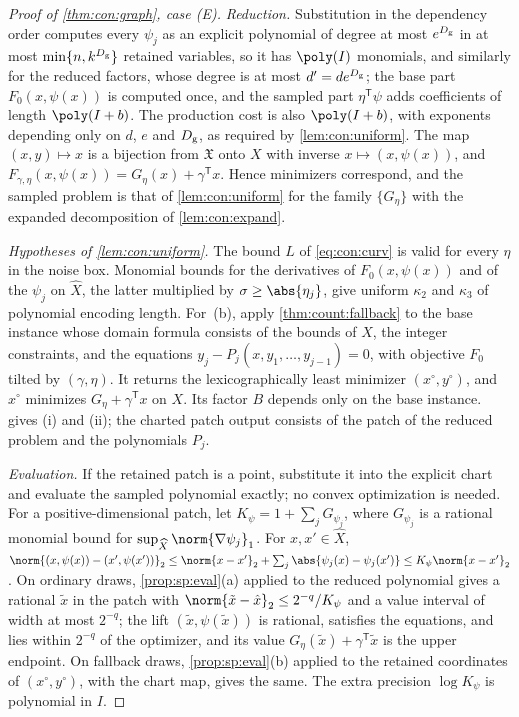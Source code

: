 \begin{proof}[Proof of \cref{thm:con:graph}, case (E)]
\emph{Reduction.} Substitution in the dependency order computes every
$\psi_j$ as an explicit polynomial of degree at most $e^{D_{\rm g}}$ in at
most $\min\{n,k^{D_{\rm g}}\}$ retained variables, so it has
$\poly(I)$ monomials, and similarly for the reduced factors, whose degree is
at most $d'=de^{D_{\rm g}}$; the base part $F_0(x,\psi(x))$ is computed once,
and the sampled part $\eta^{\mathsf T}\psi$ adds coefficients of length
$\poly(I+b)$. The production cost is also $\poly(I+b)$, with exponents
depending only on $d$, $e$ and $D_{\rm g}$, as required by
\cref{lem:con:uniform}. The map $(x,y)\mapsto x$ is a bijection from $\mathfrak X$ onto
$X$ with inverse $x\mapsto(x,\psi(x))$, and
$F_{\gamma,\eta}(x,\psi(x))=G_\eta(x)+\gamma^{\mathsf T}x$. Hence minimizers
correspond, and the sampled problem is that of \cref{lem:con:uniform} for the
family $\{G_\eta\}$ with the expanded decomposition of \cref{lem:con:expand}.

\emph{Hypotheses of \cref{lem:con:uniform}.} The bound $L$ of
\eqref{eq:con:curv} is valid for every $\eta$ in the noise box. Monomial
bounds for the derivatives of $F_0(x,\psi(x))$ and of the $\psi_j$ on
$\widehat X$, the latter multiplied by $\sigma\ge\abs{\eta_j}$, give uniform
$\kappa_2$ and $\kappa_3$ of polynomial encoding length. For~(b), apply
\cref{thm:count:fallback} to the base instance whose domain formula consists
of the bounds of $X$, the integer constraints, and the equations
$y_j-P_j(x,y_1,\dots,y_{j-1})=0$, with objective $F_0$ tilted by
$(\gamma,\eta)$. It returns the lexicographically least minimizer
$(x^\circ,y^\circ)$, and $x^\circ$ minimizes $G_\eta+\gamma^{\mathsf T}x$ on
$X$. Its factor $B$ depends only on the base instance. 
gives (i) and (ii); the charted patch output consists of the patch of the
reduced problem and the polynomials $P_j$.

\emph{Evaluation.} If the retained patch is a point, substitute it into the
explicit chart and evaluate the sampled polynomial exactly; no convex
optimization is needed. For a positive-dimensional patch, let
$K_\psi=1+\sum_jG_{\psi_j}$, where $G_{\psi_j}$ is a
rational monomial bound for $\sup_{\widehat X}\norm{\nabla\psi_j}_1$. For
$x,x'\in\widehat X$,
$\norm{(x,\psi(x))-(x',\psi(x'))}_2\le\norm{x-x'}_2+\sum_j\abs{\psi_j(x)-\psi_j(x')}
\le K_\psi\norm{x-x'}_2$. On ordinary draws, \cref{prop:sp:eval}(a) applied
to the reduced polynomial gives a rational $\tilde x$ in the patch with
$\norm{\tilde x-\hat x}_2\le2^{-q}/K_\psi$ and a value interval of width at
most $2^{-q}$; the lift $(\tilde x,\psi(\tilde x))$ is rational, satisfies the
equations, and lies within $2^{-q}$ of the optimizer, and its value
$G_\eta(\tilde x)+\gamma^{\mathsf T}\tilde x$ is the upper endpoint. On
fallback draws, \cref{prop:sp:eval}(b) applied to the retained coordinates of
$(x^\circ,y^\circ)$, with the chart map, gives the same. The extra precision
$\log K_\psi$ is polynomial in $I$.
\end{proof}

